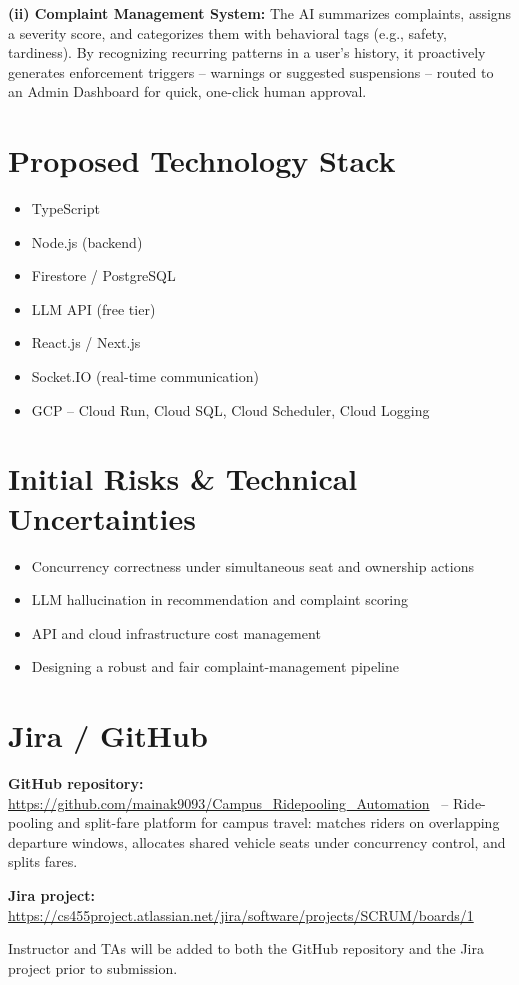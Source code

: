 \documentclass[10pt]{extarticle}
\begin{document}
\textbf{(ii) Complaint Management System:} The AI summarizes
complaints, assigns a severity score, and categorizes them with
behavioral tags (e.g., safety, tardiness). By recognizing recurring
patterns in a user's history, it proactively generates enforcement
triggers -- warnings or suggested suspensions -- routed to an Admin
Dashboard for quick, one-click human approval.

\section{Proposed Technology Stack}
\begin{itemize}
  \item TypeScript
  \item Node.js (backend)
  \item Firestore / PostgreSQL
  \item LLM API (free tier)
  \item React.js / Next.js
  \item Socket.IO (real-time communication)
  \item GCP -- Cloud Run, Cloud SQL, Cloud Scheduler, Cloud Logging
\end{itemize}

\section{Initial Risks \& Technical Uncertainties}
\begin{itemize}
  \item Concurrency correctness under simultaneous seat and ownership actions
  \item LLM hallucination in recommendation and complaint scoring
  \item API and cloud infrastructure cost management
  \item Designing a robust and fair complaint-management pipeline
\end{itemize}

\section{Jira / GitHub}
\textbf{GitHub repository:} \\
{\tiny\url{https://github.com/mainak9093/Campus_Ridepooling_Automation}}
\ -- Ride-pooling and split-fare platform for campus travel: matches
riders on overlapping departure windows, allocates shared vehicle
seats under concurrency control, and splits fares.

\textbf{Jira project:} \\
{\tiny\url{https://cs455project.atlassian.net/jira/software/projects/SCRUM/boards/1}}

Instructor and TAs will be added to both the GitHub repository and
the Jira project prior to submission.
\end{document}

